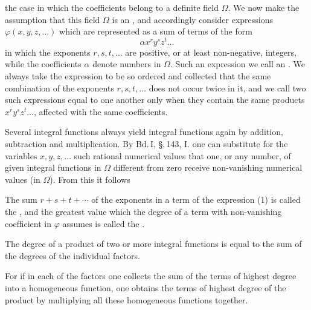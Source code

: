 
the case in which the coefficients belong to a definite field
$\Omega$. We now make the assumption that this field $\Omega$ is an
, and accordingly consider expressions
$\varphi(x, y, z, \ldots)$ which are represented as a sum of terms of the
form
\[
\alpha x^r y^s z^t \ldots
\]
in which the exponents $r, s, t, \ldots$ are positive, or at least
non-negative, integers, while the coefficients $\alpha$ denote numbers in
$\Omega$. Such an expression
we call an . We always take the
expression to be so ordered and collected that the same combination of the
exponents $r, s, t, \ldots$ does not occur twice in it, and we call two such
expressions equal to one another only when they contain the same products
$x^r y^s z^t \ldots$, affected with the same coefficients. 

Several integral functions always yield integral functions again by
addition, subtraction and multiplication. By Bd.\,I, \S.\,143, I. one can
substitute for the variables $x, y, z, \ldots$ such rational numerical
values that one, or any number, of given integral functions in $\Omega$
different from zero receive non-vanishing numerical values (in $\Omega$).
From this it follows 

The sum $r + s + t + \cdots$ of the exponents in a term of the expression
(1) is called the , and the greatest value
which the degree of a term with non-vanishing coefficient in $\varphi$
assumes is called the .

The degree of a product of two or more integral functions is equal to the
sum of the degrees of the individual factors.

For if in each of the factors one collects the sum of the terms of highest
degree into a homogeneous function, one obtains the terms of highest degree
of the product by multiplying all these homogeneous functions together.
